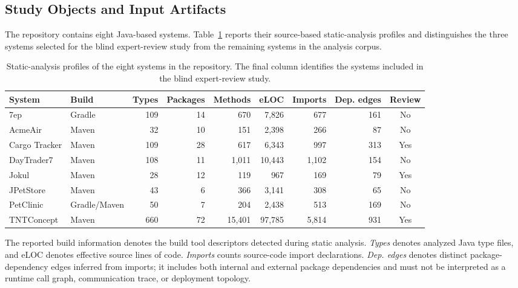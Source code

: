 \documentclass[acmsmall,screen,anonymous,review]{acmart}
\begin{document}
\subsection{Study Objects and Input Artifacts}

The repository contains eight Java-based systems. Table~\ref{tab:static-analysis-profiles} reports their source-based static-analysis profiles and distinguishes the three systems selected for the blind expert-review study from the remaining systems in the analysis corpus.

\begin{table}[t]
\centering
\caption{Static-analysis profiles of the eight systems in the repository. The final column identifies the systems included in the blind expert-review study.}
\label{tab:static-analysis-profiles}
\footnotesize
\begin{tabular}{llrrrrrrc}
\toprule
System & Build & Types & Packages & Methods & eLOC & Imports & Dep. edges & Review \\
\midrule
7ep             & Gradle       & 109 & 14 &    670 &  7,826 &   677 & 161 & No \\
AcmeAir         & Maven        &  32 & 10 &    151 &  2,398 &   266 &  87 & No \\
Cargo Tracker   & Maven        & 109 & 28 &    617 &  6,343 &   997 & 313 & Yes \\
DayTrader7      & Maven        & 108 & 11 &  1,011 & 10,443 & 1,102 & 154 & No \\
Jokul           & Maven        &  28 & 12 &    119 &    967 &   169 &  79 & Yes \\
JPetStore       & Maven        &  43 &  6 &    366 &  3,141 &   308 &  65 & No \\
PetClinic       & Gradle/Maven &  50 &  7 &    204 &  2,438 &   513 & 169 & No \\
TNTConcept      & Maven        & 660 & 72 & 15,401 & 97,785 & 5,814 & 931 & Yes \\
\bottomrule
\end{tabular}
\end{table}

The reported build information denotes the build tool descriptors detected during static analysis. \emph{Types} denotes analyzed Java type files, and eLOC denotes effective source lines of code. \emph{Imports} counts source-code import declarations. \emph{Dep. edges} denotes distinct package-dependency edges inferred from imports; it includes both internal and external package dependencies and must not be interpreted as a runtime call graph, communication trace, or deployment topology.
\end{document}
